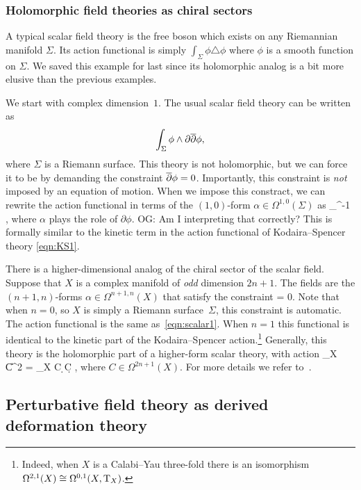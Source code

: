 \documentclass[11pt]{amsart}
\def\del{\partial}
\renewcommand{\op}{\operatorname}
\def\owen#1{{\textcolor{violet!50!black}{OG: {#1}}}}
\begin{document}
\subsubsection{Holomorphic field theories as chiral sectors}

A typical scalar field theory is the free boson which exists on any Riemannian manifold $\Sigma$.
Its action functional is simply $\int_\Sigma \phi \triangle \phi$ where $\phi$ is a smooth function on $\Sigma$.
We saved this example for last since its holomorphic analog is a bit more elusive than the previous examples.

We start with complex dimension~$1$.
The usual scalar field theory can be written as 
\[
\int_{\Sigma} \phi \wedge \del \dbar \phi, 
\]
where $\Sigma$ is a Riemann surface.
This theory is not holomorphic, but we can force it to be by demanding the constraint ${\overline{\partial}} \phi = 0$.
Importantly, this constraint is \textit{not} imposed by an equation of motion.
When we impose this constract, we can rewrite the action functional in terms of the $(1,0)$-form $\alpha \in \Omega^{1,0}(\Sigma)$ as
\beqn\label{eqn:scalar1}
\int_\Sigma \alpha \wedge \dbar \del^{-1} \alpha ,
\eeqn
where $\alpha$ plays the role of $\partial \phi$.
\owen{Am I interpreting that correctly?} 
This is formally similar to the kinetic term in the action functional of Kodaira--Spencer theory \eqref{eqn:KS1}.

There is a higher-dimensional analog of the chiral sector of the scalar field.
Suppose that $X$ is a complex manifold of \textit{odd} dimension $2n+1$.
The fields are the $(n+1,n)$-forms $\alpha \in \Omega^{n+1,n}(X)$ that satisfy the constraint
\beqn
\del \alpha = 0.
\eeqn
Note that when $n=0$, so $X$ is simply a Riemann surface~$\Sigma$, this constraint is automatic.
The action functional is the same as~\eqref{eqn:scalar1}.
When $n=1$ this functional is identical to the kinetic part of the Kodaira--Spencer action.\footnote{Indeed, when $X$ is a Calabi--Yau three-fold there is an isomorphism $\Omega^{2,1}(X) \cong \Omega^{0,1}(X, {\rm T}_X)$.}
Generally, this theory is the holomorphic part of a higher-form scalar theory, with action
\beqn
\int_X \|C\|^2 \op{dvol} = \int_X C \wedge \d \star \d C , 
\eeqn
where $C \in \Omega^{2n+1}(X)$.
For more details we refer to~\cite{GRWwzw}.

\subsection{Perturbative field theory as derived deformation theory}
\label{sec: pert dfn}
\end{document}
